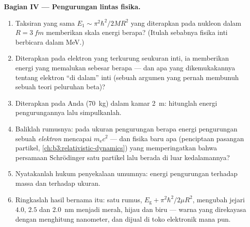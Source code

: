 \begin{problem}
\medskip\noindent\textbf{Bagian IV --- Pengurungan lintas fisika.}
\begin{enumerate}[resume]
  \item Taksiran yang sama $E_1 \sim \pi^2\hbar^2/2MR^2$ yang diterapkan
        pada nukleon dalam $R = \qty{3}{fm}$ memberikan skala energi
        berapa? (Itulah sebabnya fisika inti berbicara dalam MeV.)
  \item Diterapkan pada elektron yang terkurung seukuran inti, ia
        memberikan energi yang memalukan sebesar berapa --- dan apa yang
        dikemukakannya tentang elektron ``di dalam'' inti (sebuah
        argumen yang pernah membunuh sebuah teori peluruhan beta)?
  \item Diterapkan pada Anda (\qty{70}{kg}) dalam kamar \qty{2}{m}:
        hitunglah energi pengurungannya lalu simpulkanlah.
  \item Baliklah rumusnya: pada ukuran pengurungan berapa energi
        pengurungan sebuah \emph{elektron} mencapai 
        $m_{\text{e}}c^2$ --- dan fisika baru apa (penciptaan pasangan
        partikel, \cref{ch:b3:relativistic-dynamics}) yang memperingatkan
        bahwa persamaan Schrödinger satu partikel lalu berada di luar
        kedalamannya?
  \item Nyatakanlah hukum penyekalaan umumnya: energi pengurungan
        terhadap massa dan terhadap ukuran.
  \item Ringkaslah hasil bernama itu: satu rumus,
        $E_{\text{g}} + \pi^2\hbar^2/2\mu R^2$, mengubah jejari
        $4.0$, $2.5$ dan \qty{2.0}{nm} menjadi merah, hijau dan biru ---
        warna yang direkayasa dengan menghitung nanometer, dan dijual di
        toko elektronik mana pun.
\end{enumerate}
\end{problem}
